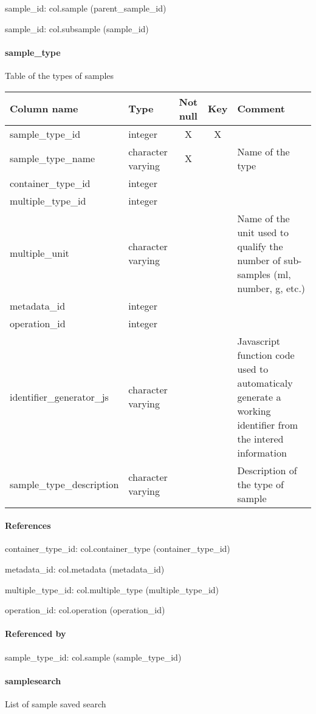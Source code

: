 sample\_id: col.sample (parent\_sample\_id)

sample\_id: col.subsample (sample\_id)

\paragraph{sample\_type}
Table of the types of samples

\begin{tabular}{|l| p{2cm}|c|c| p{5cm}|}
\hline
Column name & Type & Not null & Key & Comment \\
\hline
sample\_type\_id & integer & X & X & \\
sample\_type\_name & character varying & X &  & Name of the type\\
container\_type\_id & integer &  &  & \\
multiple\_type\_id & integer &  &  & \\
multiple\_unit & character varying &  &  & Name of the unit used  to qualify the number of sub-samples (ml, number, g, etc.)\\
metadata\_id & integer &  &  & \\
operation\_id & integer &  &  & \\
identifier\_generator\_js & character varying &  &  & Javascript function code used to automaticaly generate a working identifier from the intered information\\
sample\_type\_description & character varying &  &  & Description of the type of sample\\
\hline
\end{tabular}
\paragraph{References}
container\_type\_id: col.container\_type (container\_type\_id)

metadata\_id: col.metadata (metadata\_id)

multiple\_type\_id: col.multiple\_type (multiple\_type\_id)

operation\_id: col.operation (operation\_id)

\paragraph{Referenced by}
sample\_type\_id: col.sample (sample\_type\_id)

\paragraph{samplesearch}
List of sample saved search

